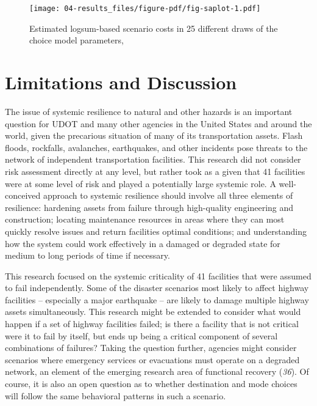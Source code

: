 \documentclass[
  letterpaper,
]{trb}
\begin{document}
\begin{figure}

{\centering \texttt{[image: 04-results\_files/figure-pdf/fig-saplot-1.pdf]}

}

\caption{\label{fig-saplot}Estimated logsum-based scenario costs in 25
different draws of the choice model parameters,}

\end{figure}


\hypertarget{limitations-and-discussion}{%
\section{Limitations and Discussion}\label{limitations-and-discussion}}

The issue of systemic resilience to natural and other hazards is an
important question for UDOT and many other agencies in the United States
and around the world, given the precarious situation of many of its
transportation assets. Flash floods, rockfalls, avalanches, earthquakes,
and other incidents pose threats to the network of independent
transportation facilities. This research did not consider risk
assessment directly at any level, but rather took as a given that 41
facilities were at some level of risk and played a potentially large
systemic role. A well-conceived approach to systemic resilience should
involve all three elements of resilience: hardening assets from failure
through high-quality engineering and construction; locating maintenance
resources in areas where they can most quickly resolve issues and return
facilities optimal conditions; and understanding how the system could
work effectively in a damaged or degraded state for medium to long
periods of time if necessary.

This research focused on the systemic criticality of 41 facilities that
were assumed to fail independently. Some of the disaster scenarios most
likely to affect highway facilities -- especially a major earthquake --
are likely to damage multiple highway assets simultaneously. This
research might be extended to consider what would happen if a set of
highway facilities failed; is there a facility that is not critical were
it to fail by itself, but ends up being a critical component of several
combinations of failures? Taking the question further, agencies might
consider scenarios where emergency services or evacuations must operate
on a degraded network, an element of the emerging research area of
functional recovery (\emph{36}). Of course, it is also an open question
as to whether destination and mode choices will follow the same
behavioral patterns in such a scenario.
\end{document}
